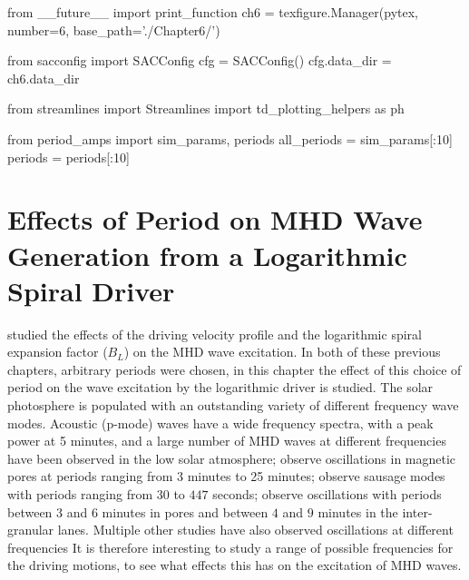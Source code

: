 \begin{pycode}[chapter6]
from __future__ import print_function
ch6 = texfigure.Manager(pytex, number=6, base_path='./Chapter6/')

from sacconfig import SACConfig
cfg = SACConfig()
cfg.data_dir = ch6.data_dir

from streamlines import Streamlines
import td_plotting_helpers as ph

from period_amps import sim_params, periods
all_periods = sim_params[:10]
periods = periods[:10]
\end{pycode}

\chapter{Effects of Period on MHD Wave Generation from a Logarithmic Spiral Driver}\label{ch:period}

 studied the effects of the driving velocity profile and the logarithmic spiral expansion factor ($B_L$) on the MHD wave excitation.
In both of these previous chapters, arbitrary periods were chosen, in this chapter the effect of this choice of period on the wave excitation by the logarithmic driver is studied.
The solar photosphere is populated with an outstanding variety of different frequency wave modes.
Acoustic (p-mode) waves have a wide frequency spectra, with a peak power at 5 minutes, and a large number of MHD waves at different frequencies have been observed in the low solar atmosphere; \cite{Freij2014,Dorotovic2014} observe oscillations in magnetic pores at periods ranging from 3 minutes to 25 minutes; \cite{morton2011} observe sausage modes with periods ranging from $30$ to $447$ seconds; \cite{fujimura2009} observe oscillations with periods between $3$ and $6$ minutes in pores and between $4$ and $9$ minutes in the inter-granular lanes.
Multiple other studies have also observed oscillations at different frequencies  \cite[e.g.][]{mathioudakis2013,reznikova2012,morton2012,mcintosh2011,zaqarashvili2009,jess2009,vecchio2007,kobanov2006,bogdan2006}
It is therefore interesting to study a range of possible frequencies for the driving motions, to see what effects this has on the excitation of MHD waves.

